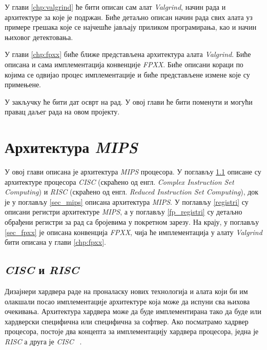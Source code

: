 \documentclass[12pt,oneside]{memoir}
\begin{document}
\indent У глави \ref{chp:valgrind} ће бити описан сам алат \textit{Valgrind}, начин рада и архитектуре за које је подржан. Биће детаљно описан начин рада свих алата уз примере грешака које се најчешће јављају приликом програмирања, као и начин њиховог детектовања.

\indent У глави \ref{chp:fpxx} биће ближе представљена архитектура алата \textit{Valgrind}. Биће описана и сама имплементација конвенције \textit{FPXX}. Биће описани кораци по којима се одвијао процес имплементације и биће представљене измене које су примењене.

\indent У закључку ће бити дат осврт на рад. У овој глави ће бити поменути и могући правац даљег рада на овом пројекту.
\chapter{Архитектура \textit{MIPS}}
\label{chp:mips}

\indent У овој глави описана је архитектура \textit{MIPS} процесора. У поглављу \ref{cisc_risc} описане су архитектуре процесора \textit{CISC} (скраћено од енгл. \textit{Complex Instruction Set Computing}) и \textit{RISC} (скраћено од енгл. \textit{Reduced Instruction Set Computing}), док је у поглављу \ref{sec_mips} описана архитектура \textit{MIPS}. У поглављу  \ref{registri} су описани регистри архитектуре \textit{MIPS}, а у поглављу \ref{fp_registri} су детаљно обрађени регистри за рад са бројевима у покретном зарезу. На крају, у поглављу \ref{sec_fpxx} је описана конвенција \textit{FPXX}, чија ће имплементација у алату \textit{Valgrind} бити описана у глави \ref{chp:fpxx}.

\section{\textit{CISC} и \textit{RISC}}
\label{cisc_risc}

\indent Дизајнери хардвера раде на проналаску нових технологија и алата који би им олакшали посао имплементације архитектуре која може да испуни сва њихова очекивања. Архитектура хардвера може да буде имплементирана тако да буде или хардверски специфична или специфична за софтвер. Ако посматрамо хадрвер процесора, постоје два концепта за имплементацију хардвера процесора, једна је \textit{RISC} а друга је \textit{CISC} ~\cite{rcRef}.
\end{document}
